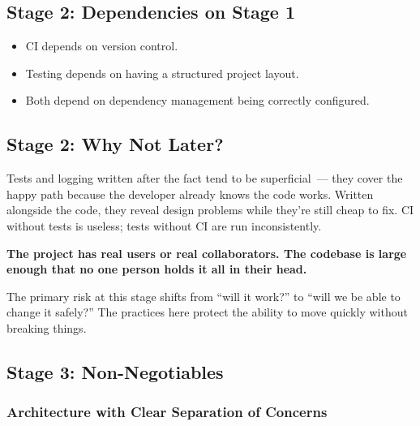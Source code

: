 \subsection*{Stage 2: Dependencies on Stage 1}\label{writing-good-code:stage-2-dependencies-on-stage-1}

\begin{itemize}
\tightlist
\item
  CI depends on version control.
\item
  Testing depends on having a structured project layout.
\item
  Both depend on dependency management being correctly configured.
\end{itemize}

\subsection*{Stage 2: Why Not Later?}\label{writing-good-code:stage-2-why-not-later}

Tests and logging written after the fact tend to be superficial~--- they cover the happy path because the developer already knows the code works. Written alongside the code, they reveal design problems while they're still cheap to fix. CI without tests is useless; tests without CI are run inconsistently.

\label{writing-good-code:stage-3--growing-codebase}

\begin{notebox}

\textbf{The project has real users or real collaborators. The codebase is large enough that no one person holds it all in their head.}

\end{notebox}

\noindent{}The primary risk at this stage shifts from ``will it work?'' to ``will we be able to change it safely?'' The practices here protect the ability to move quickly without breaking things.

\subsection*{Stage 3: Non-Negotiables}\label{writing-good-code:stage-3-non-negotiables}

\subsubsection*{Architecture with Clear Separation of Concerns}\label{writing-good-code:architecture-with-clear-separation-of-concerns}

